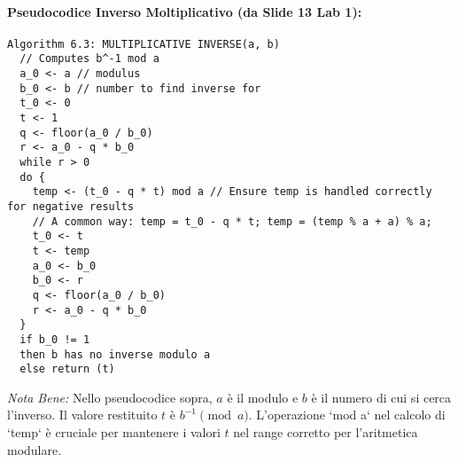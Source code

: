 \paragraph{Pseudocodice Inverso Moltiplicativo (da Slide 13 Lab 1):}
\begin{verbatim}
Algorithm 6.3: MULTIPLICATIVE INVERSE(a, b)
  // Computes b^-1 mod a
  a_0 <- a // modulus
  b_0 <- b // number to find inverse for
  t_0 <- 0
  t <- 1
  q <- floor(a_0 / b_0)
  r <- a_0 - q * b_0
  while r > 0
  do {
    temp <- (t_0 - q * t) mod a // Ensure temp is handled correctly for negative results
    // A common way: temp = t_0 - q * t; temp = (temp % a + a) % a;
    t_0 <- t
    t <- temp
    a_0 <- b_0
    b_0 <- r
    q <- floor(a_0 / b_0)
    r <- a_0 - q * b_0
  }
  if b_0 != 1
  then b has no inverse modulo a
  else return (t)
\end{verbatim}
\textit{Nota Bene:} Nello pseudocodice sopra, \(a\) è il modulo e \(b\) è il numero di cui si cerca l'inverso. Il valore restituito \(t\) è \(b^{-1} \pmod{a}\). L'operazione `mod a` nel calcolo di `temp` è cruciale per mantenere i valori \(t\) nel range corretto per l'aritmetica modulare.

